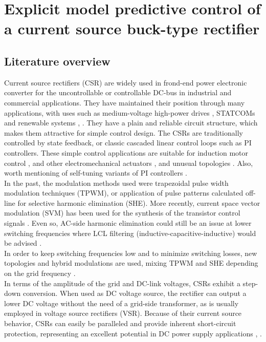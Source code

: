 \chapter[Explicit predictive current control]{Explicit model predictive control of a current source buck-type rectifier}\label{BASIC:sec:MPC_CSR}

\section{Literature overview}

Current source rectifiers (CSR) are widely used in frond-end power electronic converter for the uncontrollable or controllable DC-bus in industrial and commercial applications. They have maintained their position through many applications, with uses such as medium-voltage high-power drives \cite{vajda2017limiting}, \cite{ghalem2010six} STATCOMs \cite{gupta2014two} and renewable systems \cite{chen2016single}, \cite{exposto2015predictive}. They have a plain and reliable circuit structure, which makes them attractive for simple control design. The CSRs are traditionally controlled by state feedback, or classic cascaded linear control loops such as PI controllers. These simple control applications are suitable for induction motor control \cite{chebre2011speed}, and other electromechanical actuators \cite{salloum2014robust}, and unusual topologies \cite{neukirchner2017voltage}. Also, worth mentioning of self-tuning variants of PI controllers \cite{tahri2012digital}.\\
 In the past, the modulation methods used were trapezoidal pulse width modulation techniques (TPWM), or application of pulse patterns calculated off-line for selective harmonic elimination (SHE). More recently, current space vector modulation (SVM) has been used for the synthesis of the transistor control signals \cite{gao2017model}. Even so, AC-side harmonic elimination could still be an issue at lower switching frequencies where LCL filtering (inductive-capacitive-inductive) would be advised \cite{han2010control}.\\
In order to keep switching frequencies low and to minimize switching losses, new topologies and hybrid modulations are used, mixing TPWM and SHE depending on the grid frequency \cite{venkatraman2018multilevel}.\\
    In terms of the amplitude of the grid and DC-link voltages, CSRs exhibit a step-down conversion. When used as DC voltage source, the rectifier can output a lower DC voltage without the need of a grid-side transformer, as is usually employed in voltage source rectifiers (VSR). Because of their current source behavior, CSRs can easily be paralleled and provide inherent short-circuit protection, representing an excellent potential in DC power supply applications \cite{feroura2017finite}, \cite{yan2015study}.\\		
